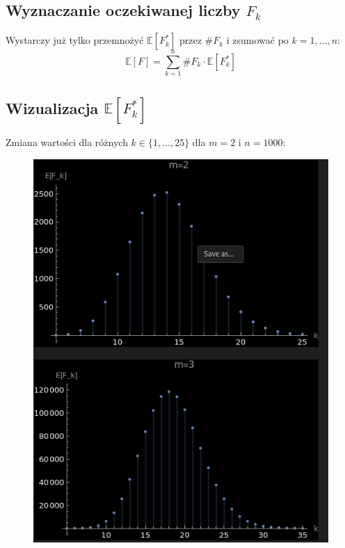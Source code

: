 \documentclass{article}
\begin{document}
\subsection{Wyznaczanie oczekiwanej liczby $F_k$}
Wystarczy już tylko przemnożyć $\mathbb{E}[F_k^*]$ przez $\#F_k$ i zsumować po $k=1, \ldots, n$:
\begin{dmath}
  \mathbb{E}[F] = \sum_{k=1}^n \#F_k \cdot \mathbb{E}[F_k^*]
\end{dmath}

\subsection{Wizualizacja $\mathbb{E}[F_k^*]$}
Zmiana wartości dla różnych $k \in \{1, \ldots, 25\}$ dla $m=2$ i $n=1000$:
\begin{figure}[h!]
  \centering
  \includegraphics[width=13cm]{../fk.png}
\end{figure}
\end{document}
